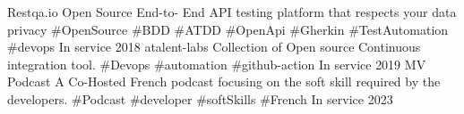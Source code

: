 
\begin{cvhonors}

  \cvhonor
    {Restqa.io} %
    {Open Source End-to- End API testing platform that respects your data privacy \#OpenSource \#BDD  \#ATDD \#OpenApi \#Gherkin \#TestAutomation \#devops}
    {In service} %
    {2018} %
  \cvhonor
    {atalent-labs} %
    {Collection of Open source Continuous integration tool. \#Devops \#automation \#github-action}
    {In service} %
    {2019} %
  \cvhonor
    {MV Podcast} %
    {A Co-Hosted French podcast focusing on the soft skill required by the developers. \#Podcast \#developer \#softSkills \#French}
    {In service} %
    {2023} %
\end{cvhonors}
